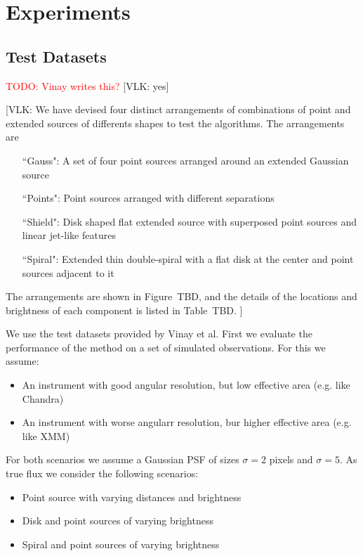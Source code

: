 \documentclass[twocolumn]{aastex631}
\newcommand{\todo}[1]{\textcolor{red}{TODO: #1}\PackageWarning{TODO:}{#1!}}
\newcommand{\vlk}[1]{{\color{blue} [VLK: #1]}}
\begin{document}
    
        
    \section{Experiments}
    \subsection{Test Datasets}
    \todo{Vinay writes this?}
    \vlk{yes}

    \vlk{We have devised four distinct arrangements of combinations of point and extended sources of differents shapes to test the algorithms.  The arrangements are 
    \begin{itemize}
        \item[ ``Gauss":] A set of four point sources arranged around an extended Gaussian source
        \item[``Points":] Point sources arranged with different separations
        \item[``Shield":] Disk shaped flat extended source with superposed point sources and linear jet-like features
        \item[``Spiral":] Extended thin double-spiral with a flat disk at the center and point sources adjacent to it
    \end{itemize}
    The arrangements are shown in Figure~TBD, and the details of the locations and brightness of each component is listed in Table~TBD.
    }

    We use the test datasets provided by Vinay et al.
    First we evaluate the performance of the method on a set of simulated observations.
    For this we assume:

    \begin{itemize}
        \item An instrument with good angular resolution, but low effective area (e.g. like Chandra)
        \item An instrument with worse angularr resolution, bur higher effective area (e.g. like XMM)
    \end{itemize}

    For both scenarios we assume a Gaussian PSF of sizes $\sigma = 2$ pixels and  $\sigma = 5$.
    As true flux we consider the following scenarios:

    \begin{itemize}
        \item Point source with varying distances and brightness
        \item Disk and point sources of varying brightness
        \item Spiral and point sources of varying brightness
    \end{itemize}
\end{document}
